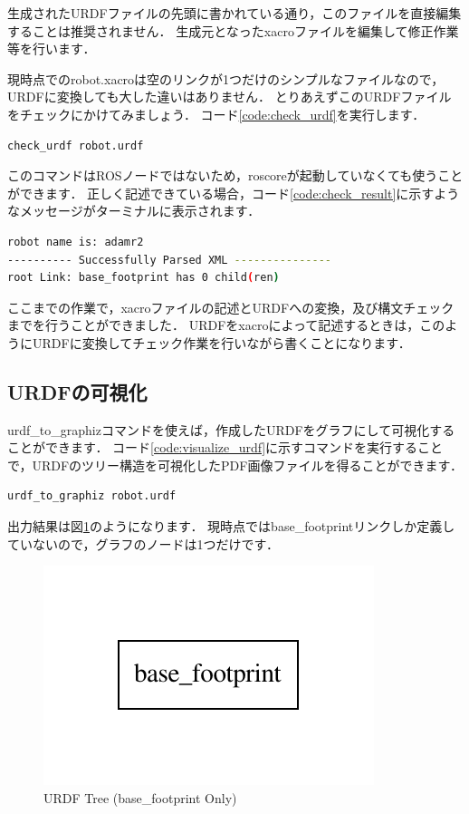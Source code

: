 \documentclass[{../../master}]{subfiles}
\begin{document}
生成されたURDFファイルの先頭に書かれている通り，このファイルを直接編集することは推奨されません．
生成元となった\textsf{xacro}ファイルを編集して修正作業等を行います．

現時点での\textsf{robot.xacro}は空のリンクが1つだけのシンプルなファイルなので，URDFに変換しても大した違いはありません．
とりあえずこのURDFファイルをチェックにかけてみましょう．
コード\ref{code:check_urdf}を実行します．

\begin{lstlisting}[language=sh, caption=Check URDF, label=code:check_urdf]
check_urdf robot.urdf
\end{lstlisting}

このコマンドはROSノードではないため，\textsf{roscore}が起動していなくても使うことができます．
正しく記述できている場合，コード\ref{code:check_result}に示すようなメッセージがターミナルに表示されます．

\begin{lstlisting}[language=sh, caption=Check Result, label=code:check_result]
robot name is: adamr2
---------- Successfully Parsed XML ---------------
root Link: base_footprint has 0 child(ren)
\end{lstlisting}

ここまでの作業で，\textsf{xacro}ファイルの記述とURDFへの変換，及び構文チェックまでを行うことができました．
URDFを\textsf{xacro}によって記述するときは，このようにURDFに変換してチェック作業を行いながら書くことになります．

\subsection{URDFの可視化}

\textsf{urdf\_to\_graphiz}コマンドを使えば，作成したURDFをグラフにして可視化することができます．
コード\ref{code:visualize_urdf}に示すコマンドを実行することで，URDFのツリー構造を可視化したPDF画像ファイルを得ることができます．

\begin{lstlisting}[language=sh, caption=Visualize URDF Tree, label=code:visualize_urdf]
urdf_to_graphiz robot.urdf
\end{lstlisting}

出力結果は図\ref{fig:urdf_graph_only_base_footprint}のようになります．
現時点では\textsf{base\_footprint}リンクしか定義していないので，グラフのノードは1つだけです．

\begin{figure}[ht]
  \centering
  \includegraphics[width=70truemm, clip]{images/urdf_graph_only_base_footprint.pdf}
  \caption{URDF Tree (\textsf{base\_footprint} Only)}
  \label{fig:urdf_graph_only_base_footprint}
\end{figure}
\end{document}
